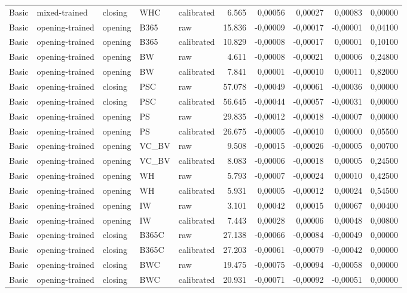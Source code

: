 {\begin{longtable}{@{}lllllrrrrr@{}}
Basic & mixed-trained & closing & WHC & calibrated & 6.565 & 0,00056 & 0,00027 & 0,00083 & 0,00000 \\
Basic & opening-trained & opening & B365 & raw & 15.836 & -0,00009 & -0,00017 & -0,00001 & 0,04100 \\
Basic & opening-trained & opening & B365 & calibrated & 10.829 & -0,00008 & -0,00017 & 0,00001 & 0,10100 \\
Basic & opening-trained & opening & BW & raw & 4.611 & -0,00008 & -0,00021 & 0,00006 & 0,24800 \\
Basic & opening-trained & opening & BW & calibrated & 7.841 & 0,00001 & -0,00010 & 0,00011 & 0,82000 \\
Basic & opening-trained & closing & PSC & raw & 57.078 & -0,00049 & -0,00061 & -0,00036 & 0,00000 \\
Basic & opening-trained & closing & PSC & calibrated & 56.645 & -0,00044 & -0,00057 & -0,00031 & 0,00000 \\
Basic & opening-trained & opening & PS & raw & 29.835 & -0,00012 & -0,00018 & -0,00007 & 0,00000 \\
Basic & opening-trained & opening & PS & calibrated & 26.675 & -0,00005 & -0,00010 & 0,00000 & 0,05500 \\
Basic & opening-trained & opening & VC\_BV & raw & 9.508 & -0,00015 & -0,00026 & -0,00005 & 0,00700 \\
Basic & opening-trained & opening & VC\_BV & calibrated & 8.083 & -0,00006 & -0,00018 & 0,00005 & 0,24500 \\
Basic & opening-trained & opening & WH & raw & 5.793 & -0,00007 & -0,00024 & 0,00010 & 0,42500 \\
Basic & opening-trained & opening & WH & calibrated & 5.931 & 0,00005 & -0,00012 & 0,00024 & 0,54500 \\
Basic & opening-trained & opening & IW & raw & 3.101 & 0,00042 & 0,00015 & 0,00067 & 0,00400 \\
Basic & opening-trained & opening & IW & calibrated & 7.443 & 0,00028 & 0,00006 & 0,00048 & 0,00800 \\
Basic & opening-trained & closing & B365C & raw & 27.138 & -0,00066 & -0,00084 & -0,00049 & 0,00000 \\
Basic & opening-trained & closing & B365C & calibrated & 27.203 & -0,00061 & -0,00079 & -0,00042 & 0,00000 \\
Basic & opening-trained & closing & BWC & raw & 19.475 & -0,00075 & -0,00094 & -0,00058 & 0,00000 \\
Basic & opening-trained & closing & BWC & calibrated & 20.931 & -0,00071 & -0,00092 & -0,00051 & 0,00000 \\

\end{longtable}}
